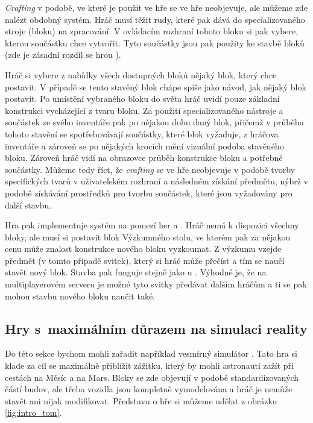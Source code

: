 \textit{Crafting} v podobě, ve které je použit ve hře \MC{} se ve hře \SE{} neobjevuje, ale můžeme zde nalézt obdobný systém. Hráč musí těžit rudy, které pak dává do specializovaného stroje (bloku) na zpracování. V ovládacím rozhraní tohoto bloku si pak vybere, kterou součástku chce vytvořit. Tyto součástky jsou pak použity ke stavbě bloků (zde je zásadní rozdíl se hrou \MC{}).

Hráč si vybere z nabídky všech dostupných bloků nějaký blok, který chce postavit. V případě \SE{} se tento stavěný blok chápe spíše jako návod, jak nějaký blok postavit. Po umístění vybraného bloku do světa hráč uvidí pouze základní konstrukci vycházející z tvaru bloku. Za použití specializovaného nástroje a součástek ze svého inventáře pak po nějakou dobu  daný blok, přičemž v průběhu tohoto stavění se spotřebovávají součástky, které blok vyžaduje, z hráčova inventáře a zároveň se po nějakých krocích mění vizuální podoba stavěného bloku. Zároveň hráč vidí na obrazovce průběh konstrukce bloku a potřebné součástky. Můžeme tedy říct, že \textit{crafting} se ve hře \SE{} neobjevuje v podobě tvorby specifických tvarů v uživatelském rozhraní a následném získání předmětu, nýbrž v podobě získávání prostředků pro tvorbu součástek, které jsou vyžadovány pro další stavbu.

Hra \ME{} pak implementuje systém na pomezí her \MC{} a \SE{}. Hráč nemá k dispozici všechny bloky, ale musí si postavit blok Výzkumného stolu, ve kterém pak za nějakou cenu může znalost konstrukce nového bloku vyzkoumat. Z výzkumu vzejde předmět (v tomto případě svitek), který si hráč může přečíst a tím se naučí stavět nový blok. Stavba pak funguje stejně jako u \SE{}. Výhodné je, že na multiplayerovém serveru je možné tyto svitky předávat dalším hráčům a ti se pak mohou stavbu nového bloku naučit také.



\subsection{Hry s~maximálním důrazem na simulaci reality}

Do této sekce bychom mohli zařadit například vesmírný simulátor \TM{}. Tato hra si klade za cíl se maximálně přiblížit zážitku, který by mohli astronauti zažít při cestách na Měsíc a na Mars. Bloky se zde objevují v podobě standardizovaných částí budov, ale třeba vozidla jsou kompletně vymodelována a hráč je nemůže stavět ani nijak modifikovat. Představu o hře si můžeme udělat z obrázku \ref{fig:intro_tom}.

